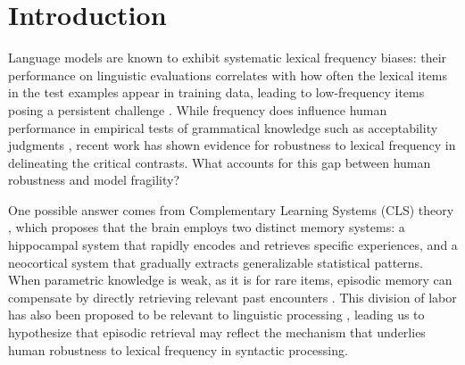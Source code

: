 \graphicspath{{ch4/papers/RAG/}}
\providecommand{\fix}{\marginpar{FIX}}
\providecommand{\new}{\marginpar{NEW}}



\section{Introduction}

Language models are known to exhibit systematic lexical frequency biases: their performance on linguistic evaluations correlates with how often the lexical items in the test examples appear in training data, leading to low-frequency items posing a persistent challenge \citep{wei-etal-2021-frequency,kim2022uncontrolled,diehl-martinez-etal-2024-mitigating}. While frequency does influence human performance in empirical tests of grammatical knowledge such as acceptability judgments \citep[i.a.]{kempen2005relationship,bader2010toward,lau2017grammaticality}, recent work \citep{christensen2024complexity} has shown evidence for robustness to lexical frequency in delineating the critical contrasts. What accounts for this gap between human robustness and model fragility?


One possible answer comes from Complementary Learning Systems (CLS) theory 
\citep{mcclelland1995there,kumaran2016learning}, which proposes that the brain employs two distinct memory systems: a hippocampal system that rapidly encodes and retrieves specific experiences, and a neocortical system that gradually extracts generalizable statistical patterns. When parametric knowledge is weak, as it is for rare items, episodic memory can compensate by directly retrieving relevant past encounters \citep{davis2009complementary}. This division of labor has also been proposed to be relevant to linguistic processing \citep{borensztajn2011episodic,duff2012hippocampus}, leading us to hypothesize that episodic retrieval may reflect the mechanism that underlies human robustness to lexical frequency in syntactic processing.

 


